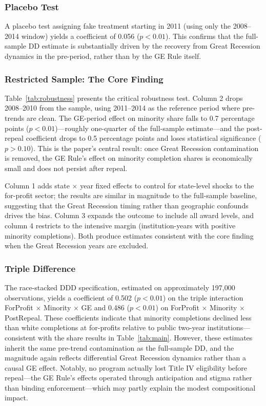 \documentclass[12pt]{article}
\begin{document}


\subsubsection*{Placebo Test} A placebo test assigning fake treatment starting in 2011 (using only the 2008--2014 window) yields a coefficient of 0.056 ($p < 0.01$). This confirms that the full-sample DD estimate is substantially driven by the recovery from Great Recession dynamics in the pre-period, rather than by the GE Rule itself.

\subsubsection*{Restricted Sample: The Core Finding} Table~\ref{tab:robustness} presents the critical robustness test. Column 2 drops 2008--2010 from the sample, using 2011--2014 as the reference period where pre-trends are clean. The GE-period effect on minority share falls to 0.7 percentage points ($p < 0.01$)---roughly one-quarter of the full-sample estimate---and the post-repeal coefficient drops to 0.5 percentage points and loses statistical significance ($p > 0.10$). This is the paper's central result: once Great Recession contamination is removed, the GE Rule's effect on minority completion shares is economically small and does not persist after repeal.

Column 1 adds state $\times$ year fixed effects to control for state-level shocks to the for-profit sector; the results are similar in magnitude to the full-sample baseline, suggesting that the Great Recession timing rather than geographic confounds drives the bias. Column 3 expands the outcome to include all award levels, and column 4 restricts to the intensive margin (institution-years with positive minority completions). Both produce estimates consistent with the core finding when the Great Recession years are excluded.



\subsubsection*{Triple Difference} The race-stacked DDD specification, estimated on approximately 197,000 observations, yields a coefficient of 0.502 ($p < 0.01$) on the triple interaction ForProfit $\times$ Minority $\times$ GE and 0.486 ($p < 0.01$) on ForProfit $\times$ Minority $\times$ PostRepeal. These coefficients indicate that minority completions declined less than white completions at for-profits relative to public two-year institutions---consistent with the share results in Table~\ref{tab:main}. However, these estimates inherit the same pre-trend contamination as the full-sample DD, and the magnitude again reflects differential Great Recession dynamics rather than a causal GE effect. Notably, no program actually lost Title IV eligibility before repeal---the GE Rule's effects operated through anticipation and stigma rather than binding enforcement---which may partly explain the modest compositional impact.
\end{document}

